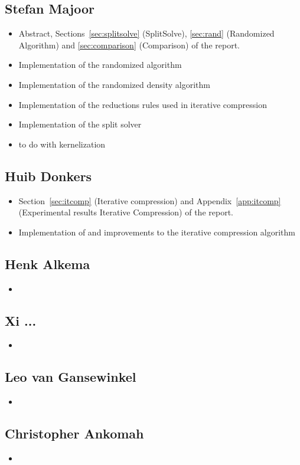 \subsection{Stefan Majoor}
\begin{itemize}
 \item Abstract, Sections~\ref{sec:splitsolve} (SplitSolve), \ref{sec:rand} (Randomized Algorithm) and \ref{sec:comparison} (Comparison) of the report.
 \item Implementation of the randomized algorithm
 \item Implementation of the randomized density algorithm
 \item Implementation of the reductions rules used in iterative compression
 \item Implementation of the split solver
 \item {} to do with kernelization
\end{itemize}

\subsection{Huib Donkers}
\begin{itemize}
 \item Section~\ref{sec:itcomp} (Iterative compression) and Appendix~\ref{app:itcomp} (Experimental results Iterative Compression) of the report.
 \item Implementation of and improvements to the iterative compression algorithm
\end{itemize}

\subsection{Henk Alkema}
\begin{itemize}
 \item 
\end{itemize}

\subsection{Xi ...}
\begin{itemize}
 \item 
\end{itemize}

\subsection{Leo van Gansewinkel}
\begin{itemize}
 \item 
\end{itemize}

\subsection{Christopher Ankomah}
\begin{itemize}
 \item 
\end{itemize}

